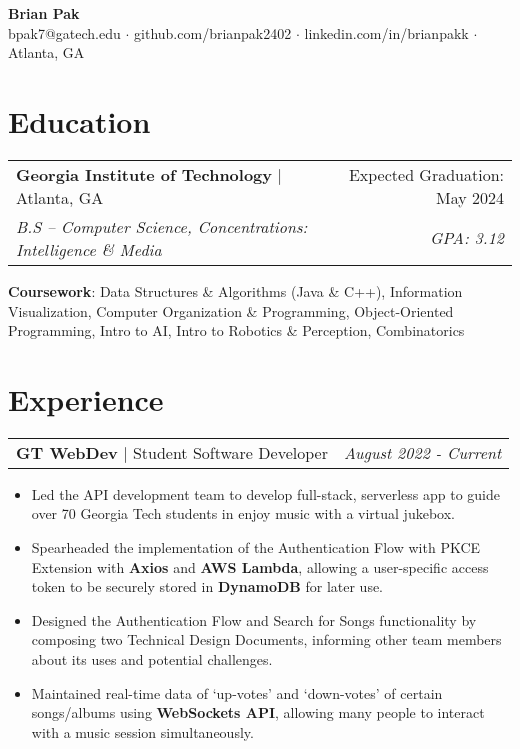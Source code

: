 \documentclass[letterpaper,11pt]{article}
\makeatletter
\newcommand{\resumeEducationHeading}[5]{
    \begin{tabular*}{0.99\textwidth}[t]{l@{\extracolsep{\fill}}r}
      \textbf{#1} $\vert$ #2 & #3 \\
      \textit{\small#4} & \textit{\small #5} \\
    \end{tabular*}\vspace{0.5pt}
}
\newcommand{\resumeExperienceHeading}[3]{
    \begin{tabular*}{0.99\textwidth}[t]{l@{\extracolsep{\fill}}r}
      \textbf{#1} $\vert$ {#2} & \textit{#3} \\
    \end{tabular*}\vspace{-3pt}
}
\newcommand{\resumeItemListStart}{\begin{itemize}[noitemsep]\vspace{-4pt}}
\newcommand{\resumeItemListEnd}{\end{itemize}}
\makeatother
\begin{document}
\begin{center}
  \textbf{\huge Brian Pak} \\
  \vspace*{0.1cm}
  {bpak7@gatech.edu}  $\cdot$ {github.com/brianpak2402} $\cdot$ {linkedin.com/in/brianpakk}  $\cdot$ Atlanta, GA
\end{center}

\section{Education}
    \resumeEducationHeading
      {Georgia Institute of Technology}{Atlanta, GA}{Expected Graduation: May 2024}
      {B.S -- Computer Science, Concentrations: Intelligence \& Media}{GPA: 3.12\vspace{0.1cm}} 
    \textbf{Coursework}{: Data Structures \& Algorithms (Java \& C++), Information Visualization, Computer Organization \& Programming, Object-Oriented Programming, Intro to AI, Intro to Robotics \& Perception, Combinatorics} \\

\section{Experience}
  \resumeExperienceHeading{GT WebDev}{Student Software Developer}{August 2022 - Current}
    \resumeItemListStart
      \item {Led the API development team to develop full-stack, serverless app to guide over 70 Georgia Tech students in enjoy music with a virtual jukebox.}
      \item {Spearheaded the implementation of the Authentication Flow with PKCE Extension with \textbf{Axios} and \textbf{AWS Lambda}, allowing a user-specific access token to be securely stored in \textbf{DynamoDB} for later use.}
      \item {Designed the Authentication Flow and Search for Songs functionality by composing two Technical Design Documents, informing other team members about its uses and potential challenges.}
      \item {Maintained real-time data of `up-votes' and `down-votes' of certain songs/albums using \textbf{WebSockets API}, allowing many people to interact with a music session simultaneously.}
    \resumeItemListEnd
  
\end{document}
